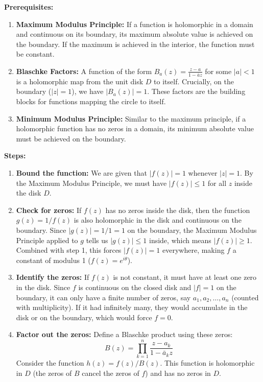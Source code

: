 \begin{solution}
\textbf{Prerequisites:}
\begin{enumerate}
    \item \textbf{Maximum Modulus Principle:} If a function is holomorphic in a domain and continuous on its boundary, its maximum absolute value is achieved on the boundary. If the maximum is achieved in the interior, the function must be constant.
    \item \textbf{Blaschke Factors:} A function of the form $B_a(z) = \frac{z - a}{1 - \bar{a} z}$ for some $|a| < 1$ is a holomorphic map from the unit disk $D$ to itself. Crucially, on the boundary ($|z|=1$), we have $|B_a(z)| = 1$. These factors are the building blocks for functions mapping the circle to itself.
    \item \textbf{Minimum Modulus Principle:} Similar to the maximum principle, if a holomorphic function has no zeros in a domain, its minimum absolute value must be achieved on the boundary.
\end{enumerate}
\par\medskip
\textbf{Steps:}
\begin{enumerate}
    \item \textbf{Bound the function:} We are given that $|f(z)| = 1$ whenever $|z| = 1$. By the Maximum Modulus Principle, we must have $|f(z)| \leq 1$ for all $z$ inside the disk $D$.
    \item \textbf{Check for zeros:} If $f(z)$ has no zeros inside the disk, then the function $g(z) = 1/f(z)$ is also holomorphic in the disk and continuous on the boundary. Since $|g(z)| = 1/1 = 1$ on the boundary, the Maximum Modulus Principle applied to $g$ tells us $|g(z)| \leq 1$ inside, which means $|f(z)| \geq 1$. Combined with step 1, this forces $|f(z)| = 1$ everywhere, making $f$ a constant of modulus 1 ($f(z) = e^{i\theta}$).
    \item \textbf{Identify the zeros:} If $f(z)$ is not constant, it must have at least one zero in the disk. Since $f$ is continuous on the closed disk and $|f|=1$ on the boundary, it can only have a finite number of zeros, say $a_1, a_2, \dots, a_n$ (counted with multiplicity). If it had infinitely many, they would accumulate in the disk or on the boundary, which would force $f=0$.
    \item \textbf{Factor out the zeros:} Define a Blaschke product using these zeros:
    \[ B(z) = \prod_{k=1}^n \frac{z - a_k}{1 - \bar{a}_k z} \]
    Consider the function $h(z) = f(z) / B(z)$. This function is holomorphic in $D$ (the zeros of $B$ cancel the zeros of $f$) and has no zeros in $D$.

\end{enumerate}
\end{solution}
